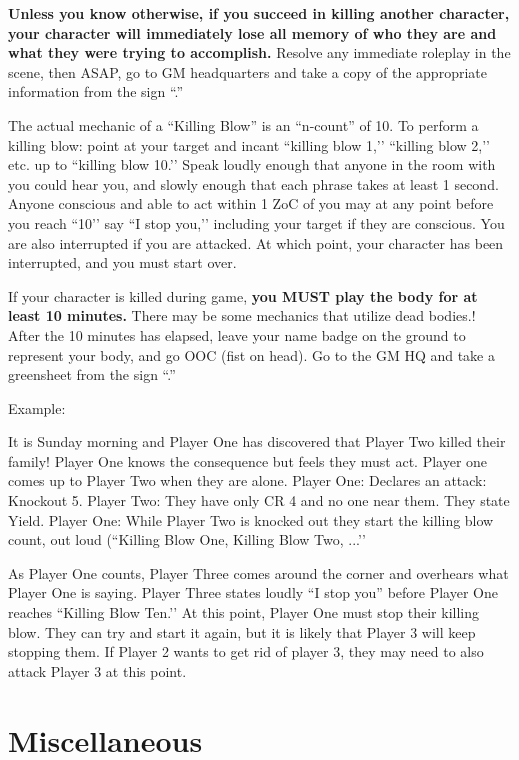 \documentclass[sheet]{GL2020}
\begin{document}
{\textbf{Unless you know otherwise, if you succeed in killing another character, your character will immediately lose all memory of who they are and what they were trying to accomplish.} Resolve any immediate roleplay in the scene, then ASAP, go to GM headquarters and take a copy of the appropriate information from the sign ``\sMurderConsequences{}.''

The actual mechanic of a ``Killing Blow'' is an ``n-count'' of 10. To perform a killing blow: point at your target and incant ``killing blow 1,'’ ``killing blow 2,'’ etc. up to ``killing blow 10.'’ Speak loudly enough that anyone in the room with you could hear you, and slowly enough that each phrase takes at least 1 second. Anyone conscious and able to act within 1 ZoC of you may at any point before you reach ``10'’ say ``I stop you,'’ including your target if they are conscious. You are also interrupted if you are attacked. At which point, your character has been interrupted, and you must start over.

If your character is killed during game, \textbf{you MUST play the body for at least 10 minutes.} There may be some mechanics that utilize dead bodies.! After the 10 minutes has elapsed, leave your name badge on the ground to represent your body, and go OOC (fist on head). Go to the GM HQ and take a greensheet from the sign ``\sMurdered{}.''

Example:

It is Sunday morning and Player One has discovered that Player Two killed their family!  Player One knows the consequence but feels they must act.  Player one comes up to Player Two when they are alone.  
Player One:  Declares an attack: Knockout 5.  
Player Two:  They have only CR 4 and no one near them.  They state Yield.
Player One: While Player Two is knocked out they start the killing blow count, out loud (``Killing Blow One, Killing Blow Two, ...’’

As Player One counts, Player Three comes around the corner and overhears what Player One is saying.  Player Three states loudly “I stop you” before Player One reaches ``Killing Blow Ten.’’  At this point, Player One must stop their killing blow.  They can try and start it again, but it is likely that Player 3 will keep stopping them.  If Player 2 wants to get rid of player 3, they may need to also attack Player 3 at this point.

\section{Miscellaneous}

}
\end{document}
